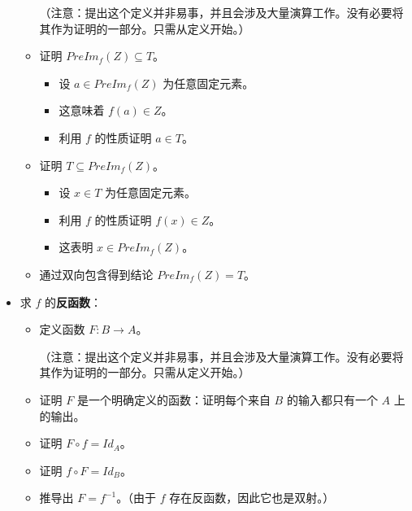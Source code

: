 \begin{itemize}
\begin{itemize}
                    （注意：提出这个定义并非易事，并且会涉及大量演算工作。没有必要将其作为证明的一部分。只需从定义开始。）
              \item 证明 $PreIm_f(Z) \subseteq T$。
                    \begin{itemize}
                        \item 设 $a \in PreIm_f(Z)$ 为任意固定元素。
                        \item 这意味着 $f(a) \in Z$。
                        \item 利用 $f$ 的性质证明 $a \in T$。
                    \end{itemize}
              \item 证明 $T \subseteq PreIm_f(Z)$。
                    \begin{itemize}
                        \item 设 $x \in T$ 为任意固定元素。
                        \item 利用 $f$ 的性质证明 $f(x) \in Z$。
                        \item 这表明 $x \in PreIm_f(Z)$。
                    \end{itemize}
              \item 通过双向包含得到结论 $PreIm_f (Z) = T$。
          \end{itemize}
    \item 求 $f$ 的\textbf{反函数}：
          \begin{itemize}
              \item 定义函数 $F: B \to A$。

                    （注意：提出这个定义并非易事，并且会涉及大量演算工作。没有必要将其作为证明的一部分。只需从定义开始。）
              \item 证明 $F$ 是一个明确定义的函数：证明每个来自 $B$ 的输入都只有一个 $A$ 上的输出。
              \item 证明 $F \circ f = Id_A$。
              \item 证明 $f \circ F = Id_B$。
              \item 推导出 $F = f^{-1}$。（由于 $f$ 存在反函数，因此它也是双射。）
          \end{itemize}
\end{itemize}
